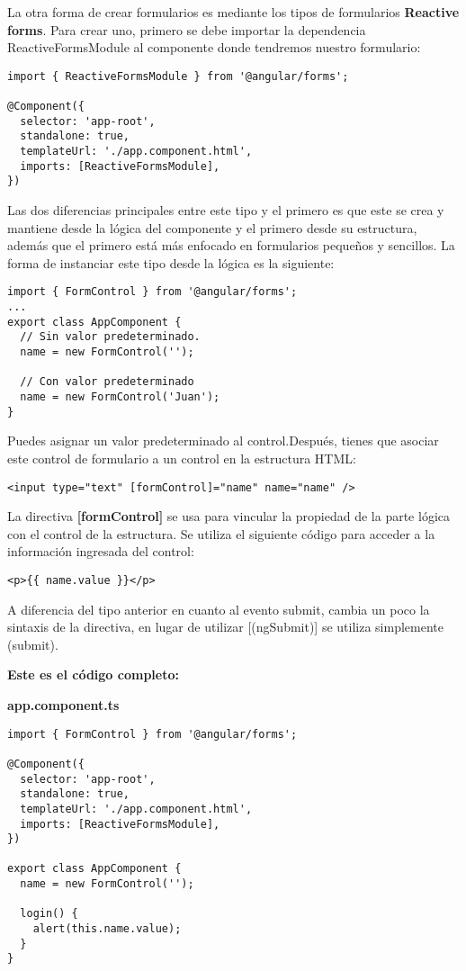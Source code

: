 La otra forma de crear formularios es mediante los tipos de formularios \textbf{Reactive forms}. Para crear uno, primero se debe importar la dependencia ReactiveFormsModule al componente donde tendremos nuestro formulario:
\begin{lstlisting}[style=htmlcssjs]
import { ReactiveFormsModule } from '@angular/forms';

@Component({
  selector: 'app-root',
  standalone: true,
  templateUrl: './app.component.html',
  imports: [ReactiveFormsModule],
})
\end{lstlisting}

Las dos diferencias principales entre este tipo y el primero es que este se crea y mantiene desde la lógica del componente y el primero desde su estructura, además que el primero está más enfocado en formularios pequeños y sencillos. La forma de instanciar este tipo desde la lógica es la siguiente:
\begin{lstlisting}[style=htmlcssjs]
import { FormControl } from '@angular/forms';
...
export class AppComponent {
  // Sin valor predeterminado.
  name = new FormControl(''); 

  // Con valor predeterminado
  name = new FormControl('Juan');
}
\end{lstlisting}

Puedes asignar un valor predeterminado al control.Después, tienes que asociar este control de formulario a un control en la estructura HTML:
\begin{lstlisting}[style=htmlcssjs]
<input type="text" [formControl]="name" name="name" />
\end{lstlisting}

La directiva \textbf{[formControl]} se usa para vincular la propiedad de la parte lógica con el control de la estructura. Se utiliza el siguiente código para acceder a la información ingresada del control:
\begin{lstlisting}[style=htmlcssjs]
<p>{{ name.value }}</p>
\end{lstlisting}

A diferencia del tipo anterior en cuanto al evento submit, cambia un poco la sintaxis de la directiva, en lugar de utilizar [(ngSubmit)] se utiliza simplemente (submit).

\textbf{Este es el código completo:}

\textbf{app.component.ts}
\begin{lstlisting}[style=htmlcssjs]
import { FormControl } from '@angular/forms';

@Component({
  selector: 'app-root',
  standalone: true,
  templateUrl: './app.component.html',
  imports: [ReactiveFormsModule],
})

export class AppComponent {
  name = new FormControl('');

  login() {
    alert(this.name.value);
  }
}
\end{lstlisting}

